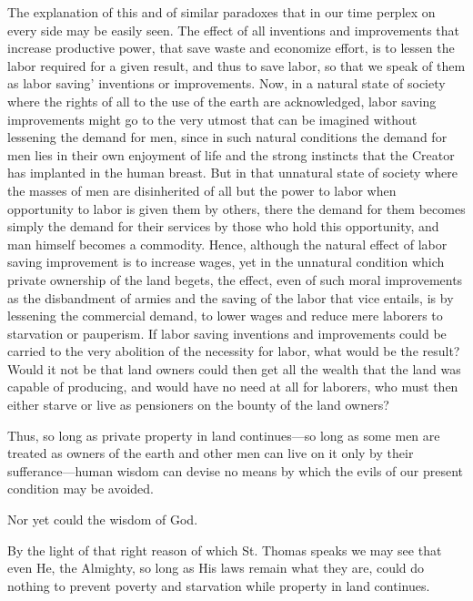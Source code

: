 \documentclass{book}
\begin{document}
The explanation of this and of similar paradoxes that in our time perplex on every side may be easily seen. The effect of all inventions and improvements that increase productive power, that save waste and economize effort, is to lessen the labor required for a given result, and thus to save labor, so that we speak of them as labor saving’ inventions or improvements. Now, in a natural state of society where the rights of all to the use of the earth are acknowledged, labor saving improvements might go to the very utmost that can be imagined without lessening the demand for men, since in such natural conditions the demand for men lies in their own enjoyment of life and the strong instincts that the Creator has implanted in the human breast. But in that unnatural state of society where the masses of men are disinherited of all but the power to labor when opportunity to labor is given them by others, there the demand for them becomes simply the demand for their services by those who hold this opportunity, and man himself becomes a commodity. Hence, although the natural effect of labor saving improvement is to increase wages, yet in the unnatural condition which private ownership of the land begets, the effect, even of such moral improvements as the disbandment of armies and the saving of the labor that vice entails, is by lessening the commercial demand, to lower wages and reduce mere laborers to starvation or pauperism. If labor saving inventions and improvements could be carried to the very abolition of the necessity for labor, what would be the result? Would it not be that land owners could then get all the wealth that the land was capable of producing, and would have no need at all for laborers, who must then either starve or live as pensioners on the bounty of the land owners?

Thus, so long as private property in land continues—so long as some men are treated as owners of the earth and other men can live on it only by their sufferance—human wisdom can devise no means by which the evils of our present condition may be avoided.

Nor yet could the wisdom of God.

By the light of that right reason of which St. Thomas speaks we may see that even He, the Almighty, so long as His laws remain what they are, could do nothing to prevent poverty and starvation while property in land continues.
\end{document}
